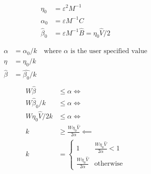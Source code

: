 
\begin{align*}
    \eta_0 &= \varepsilon^2 M^{-1} \\
    \alpha_0 &= \varepsilon M^{-1} C \\
    \hat{\beta}_0 &= \varepsilon M^{-1} \hat{B} = \eta_0\hat{V}/2
\end{align*}

\begin{align*}
    \alpha &= \alpha_0/k \quad \text{where $\alpha$ is the user specified value} \\
    \eta &= \eta_0/k  \\
    \hat{\beta} &= \hat{\beta_0}/k \\
\end{align*}
\begin{align*}
    W \hat{\beta} &\leq \alpha \Leftrightarrow\\ 
    W \hat{\beta}_0/k &\leq \alpha \Leftrightarrow\\ 
    W \eta_0 \hat{V}/2k &\leq \alpha \Leftrightarrow \\
    k &\geq \frac{W\eta_0 \hat{V}}{2 \alpha} \impliedby \\
    k &= \begin{cases}
        1 & \frac{W\eta_0 \hat{V}}{2  \alpha} < 1 \\
        \frac{W\eta_0 \hat{V}}{2 \alpha} & \text{otherwise}
    \end{cases}
\end{align*}